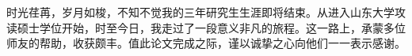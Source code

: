 \begin{thanks}
时光荏苒，岁月如梭，不知不觉我的三年研究生生涯即将结束。从进入山东大学攻读硕士学位开始，时至今日，我走过了一段意义非凡的旅程。这一路上，承蒙多位师友的帮助，收获颇丰。值此论文完成之际，谨以诚挚之心向他们一一表示感谢。
\end{thanks}
